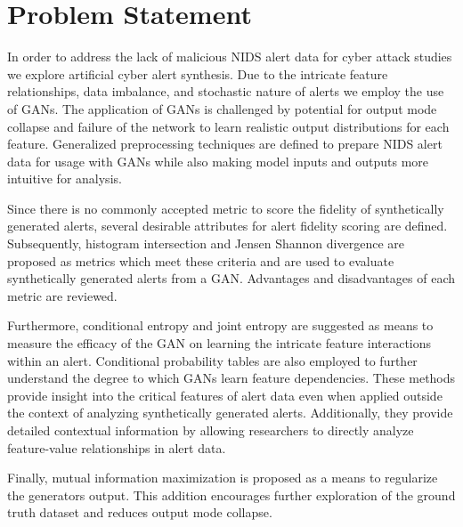 \section{Problem Statement}

In order to address the lack of malicious NIDS alert data for cyber attack studies we explore artificial cyber alert synthesis. Due to the intricate feature relationships, data imbalance, and stochastic nature of alerts we employ the use of GANs. The application of GANs is challenged by potential for output mode collapse and failure of the network to learn realistic output distributions for each feature. Generalized preprocessing techniques are defined to prepare NIDS alert data for usage with GANs while also making model inputs and outputs more intuitive for analysis. 

Since there is no commonly accepted metric to score the fidelity of synthetically generated alerts, several desirable attributes for alert fidelity scoring are defined. Subsequently, histogram intersection and Jensen Shannon divergence are proposed as metrics which meet these criteria and are used to evaluate synthetically generated alerts from a GAN. Advantages and disadvantages of each metric are reviewed. 

Furthermore, conditional entropy and joint entropy are suggested as means to measure the efficacy of the GAN on learning the intricate feature interactions within an alert. Conditional probability tables are also employed to further understand the degree to which GANs learn feature dependencies. These methods provide insight into the critical features of alert data even when applied outside the context of analyzing synthetically generated alerts. Additionally, they provide detailed contextual information by allowing researchers to directly analyze feature-value relationships in alert data. 

Finally, mutual information maximization is proposed as a means to regularize the generators output. This addition encourages further exploration of the ground truth dataset and reduces output mode collapse.  


